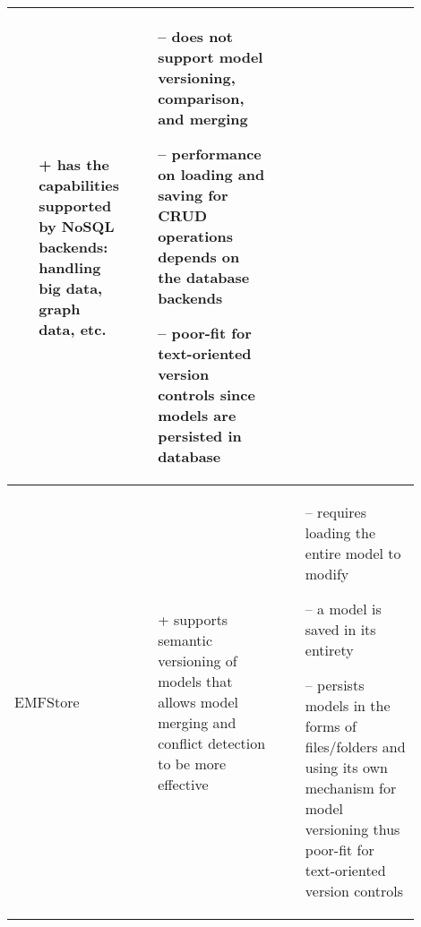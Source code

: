 \begin{table*}[]
\begin{scriptsize}
\begin{tabular}{
      |>{\centering\arraybackslash}m{0.1\linewidth}
      |>{\centering\arraybackslash}m{0.4\linewidth}
      |>{\centering\arraybackslash}m{0.4\linewidth}
      |}
\begin{minipage}[t]{\linewidth}
\begin{itemize}[leftmargin=7pt]
        \item[+] has the capabilities supported by NoSQL backends: handling big data, graph data, etc.
      \end{itemize}
    \end{minipage}
    &
    \begin{minipage}[t]{\linewidth}
      \raggedright
      \begin{itemize}[leftmargin=7pt]
        \setlength
        \item[--] does not support model versioning, comparison, and merging
        \item[--] performance on loading and saving for CRUD operations depends on the database backends
        \item[--] poor-fit for text-oriented version controls since models are persisted in database
      \end{itemize}
    \end{minipage} 
    \\
    \hline
    EMFStore
    &
    \begin{minipage}[t]{\linewidth}
      \raggedright
      \begin{itemize}[leftmargin=7pt]
        \setlength
        \item[+] supports semantic versioning of models that allows model merging and conflict detection to be more effective
      \end{itemize}
    \end{minipage}
    &
    \begin{minipage}[t]{\linewidth}
      \raggedright
      \begin{itemize}[leftmargin=7pt]
        \setlength
        \item[--] requires loading the entire model to modify
        \item[--] a model is saved in its entirety
        \item[--] persists models in the forms of files/folders and using its own mechanism for model versioning thus poor-fit for text-oriented version controls
      \end{itemize}
    \end{minipage} 
    \\
    \hline
  \end{tabular}
\end{scriptsize}
\end{table*}
  
